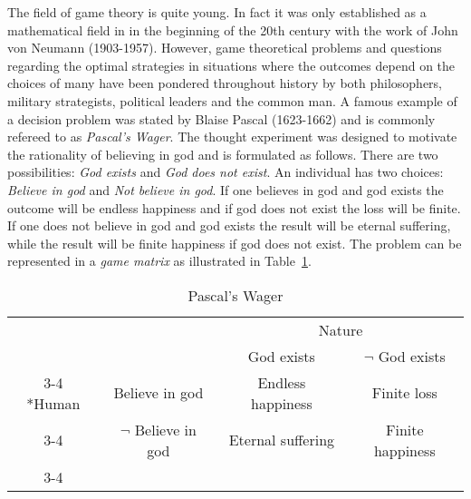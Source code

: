 \documentclass{article}
\theoremstyle{definition}
\theoremstyle{remark}
\begin{document}
The field of game theory is quite young. In fact it was only established
as a mathematical field in in the beginning of the 20th century with
the work of John von Neumann (1903-1957). However, game
theoretical problems and questions regarding the optimal strategies in
situations where the outcomes depend on the choices of many have been
pondered throughout history by both philosophers, military
strategists, political leaders and the common man. A famous example of
a decision problem was stated by Blaise Pascal (1623-1662) and is
commonly refereed to as \emph{Pascal's Wager}. The thought experiment
was designed to motivate the rationality of believing in god and is
formulated as follows. There are two possibilities: \emph{God exists}
and \emph{God does not exist}. An individual has two choices:
\emph{Believe in god} and \emph{Not believe in god}. If one believes
in god and god exists the outcome will be endless happiness and if god
does not exist the loss will be finite. If one does not believe in god
and god exists the result will be eternal suffering, while the result
will be finite happiness if god does not exist. \citep{sep-pascal-wager} The problem can be
represented in a \emph{game matrix} as illustrated in Table~\ref{Pascal}.  


\begin{table}[h!]
  \centering
  \setlength{\extrarowheight}{2pt}
  \begin{tabular}{cc|c|c|}
    & \multicolumn{1}{c}{} & \multicolumn{2}{c}{Nature}\\
    & \multicolumn{1}{c}{} & \multicolumn{1}{c}{God exists}  &
                                                              \multicolumn{1}{c}{$\neg$
                                                               God exists}
    \\\cline{3-4}
\multirow{2}*{Human}  & Believe in god & Endless happiness & Finite loss \\\cline{3-4}
    & $\neg$ Believe in god & Eternal suffering & Finite happiness \\\cline{3-4}
  \end{tabular}
  \caption{Pascal's Wager}
  \label{Pascal}
\end{table}
\end{document}
